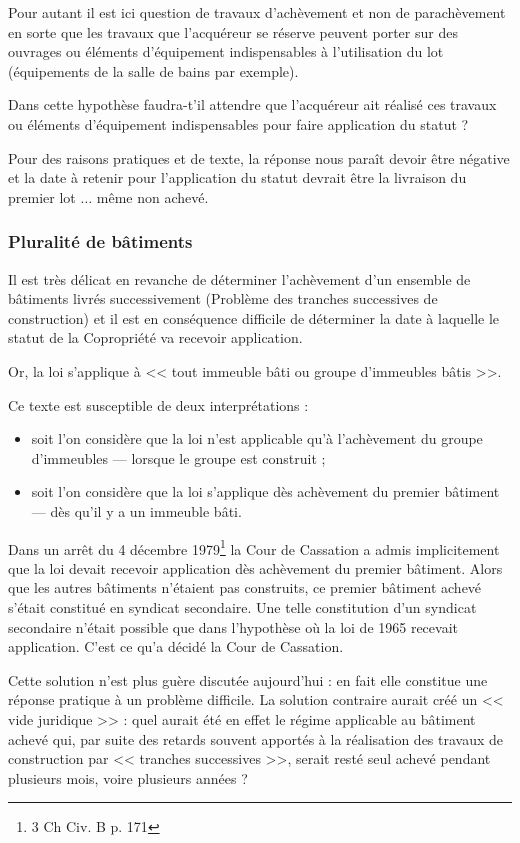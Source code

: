 			Pour autant il est ici question de travaux d’achèvement et non de parachèvement en sorte que les travaux que l’acquéreur se réserve peuvent porter sur des ouvrages ou éléments d’équipement indispensables à l’utilisation du lot (équipements de la salle de bains par exemple).
			
			Dans cette hypothèse faudra-t’il attendre que l’acquéreur ait réalisé ces travaux ou éléments d’équipement indispensables pour faire application du statut ?
			
			Pour des raisons pratiques et de texte, la réponse nous paraît devoir être négative et la date à retenir pour l’application du statut devrait être la livraison du premier lot $\dots$ même non achevé.
		
		\subsubsection{Pluralité de bâtiments}
		
			Il est très délicat en revanche de déterminer l'achèvement d'un ensemble de bâtiments livrés successivement (Problème des tranches successives de construction) et il est en conséquence difficile de déterminer la date à laquelle le statut de la Copropriété va recevoir application.
			
			Or, la loi s'applique à << tout immeuble bâti ou groupe d'immeubles bâtis >>.
			
			Ce texte est susceptible de deux interprétations :
			\begin{itemize}
				\item soit l'on considère que la loi n'est applicable qu'à l'achèvement du groupe d'immeubles --- lorsque le groupe est construit ;
				\item soit l'on considère que la loi s'applique dès achèvement du premier bâtiment --- dès qu'il y a un immeuble bâti.
			\end{itemize}
		
			Dans un arrêt du 4 décembre 1979\footnote{3\degre{} Ch Civ. B  p. 171} la Cour de Cassation a admis implicitement que la loi devait recevoir application dès achèvement du premier bâtiment.
			Alors que les autres bâtiments n'étaient pas construits, ce premier bâtiment achevé s'était constitué en syndicat secondaire. Une telle constitution d'un syndicat secondaire n'était possible que dans l'hypothèse où la loi de 1965 recevait application. C'est ce qu'a décidé la Cour de Cassation.
			
			Cette solution n'est plus guère discutée aujourd'hui : en fait elle constitue une réponse pratique à un problème difficile. La solution contraire aurait créé un << vide juridique >> : quel aurait été en effet le régime applicable au bâtiment achevé qui, par suite des retards souvent apportés à la réalisation des travaux de construction par << tranches successives >>, serait resté seul achevé pendant plusieurs mois, voire plusieurs années ?
			
